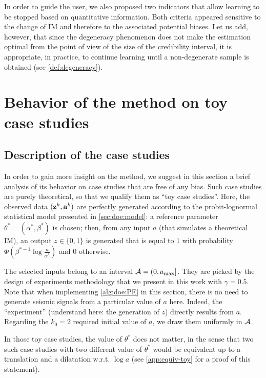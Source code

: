 In order to guide the user, we also proposed two indicators that allow learning to be stopped based on quantitative information. Both criteria appeared sensitive to the change of IM and therefore to the associated potential biases. Let us add, however, that since the degeneracy phenomenon does not make the estimation optimal from the point of view of the size of the credibility interval, it is appropriate, in practice, to continue learning until a non-degenerate sample is obtained (see \cref{def:degeneracy}).



\section{Behavior of the method on toy case studies}\label{app:doe:toycases}

    \subsection{Description of the case studies}
    

    In order to gain more insight on the method, we suggest in this section a brief analysis of its behavior on case studies that are free of any bias. 
    Such case studies are purely theoretical, so that we qualify them as ``toy case studies''. Here, the observed data $(\mathbf{z}^k,\mathbf{a}^k)$ are perfectly generated according to the probit-lognormal statistical model presented in \cref{sec:doe:model}:
    a reference parameter $\theta^\ast=(\alpha^\ast,\beta^\ast)$ is chosen; then, from any input $a$ (that simulates a theoretical IM), an output $z\in\{0,1\}$ is generated that is equal to $1$ with probability $\Phi\left(\beta^{\ast -1}\log\frac{a}{\alpha^{\ast}}\right)$ and $0$ otherwise.
    
    The selected inputs belong to an interval $\mathcal{A}=(0,a_{\text{max}}]$.
    They are picked by the {design} of experiments methodology that we present in this work with $\gamma=0.5$. Note that when implementing \cref{alg:doe:PE} in this section, there is no need to generate seismic signals from a particular value of $a$ here. Indeed, the ``experiment'' (understand here: the generation of $z$) directly results from $a$.
    Regarding the $k_0=2$ required initial value of $a$, we draw them uniformly in $\mathcal{A}$.
    
    In those toy case studies, the value of $\theta^\ast$ does not matter, in the sense that two such case studies with two different value of $\theta^\ast$ would be equivalent up to a translation and a dilatation w.r.t. $\log a$ (see \cref{app:equiv-toy} for a proof of this statement).
    
